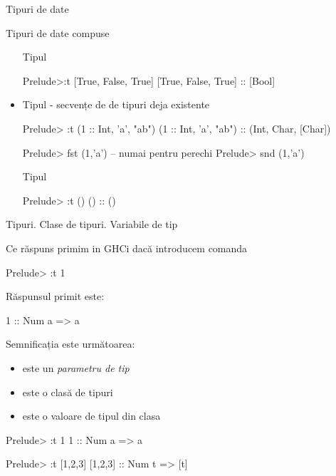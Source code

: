 \documentclass[xcolor=pdftex,romanian,colorlinks]{beamer}
\begin{document}
\begin{section}{Tipuri de date}
\begin{frame}[fragile]{Tipuri de date compuse}
\begin{itemize}
\vitem Tipul 
\begin{asciihs}
Prelude>:t [True, False, True]
[True, False, True] :: [Bool]

\end{asciihs}

\item Tipul  - secvențe de de tipuri deja existente
\begin{asciihs}
Prelude> :t (1 :: Int, 'a', "ab")
(1 :: Int, 'a', "ab") :: (Int, Char, [Char])

Prelude> fst (1,'a') -- numai pentru perechi
Prelude> snd (1,'a')
\end{asciihs}

\vitem  Tipul 
\begin{asciihs}
Prelude> :t ()
() :: ()
\end{asciihs}

\end{itemize}
\end{frame}

\begin{frame}[fragile]{Tipuri. Clase de tipuri. Variabile de tip}

Ce răspuns primim in GHCi dacă introducem comanda
\begin{asciihs}
Prelude> :t 1
\end{asciihs}
\pause

Răspunsul primit este:
 \begin{asciihs}
 1 :: Num a => a
 \end{asciihs}

Semnificația este următoarea:

\begin{itemize}
\item {} este un {\it parametru de tip}
\item {} este o clasă de tipuri
\item {} este o valoare de tipul  din clasa
\end{itemize}
\begin{asciihs}
Prelude> :t 1
1 :: Num a => a

Prelude> :t [1,2,3]
[1,2,3] :: Num t => [t]

\end{asciihs}




\end{frame}



\end{section} %
\end{document}
